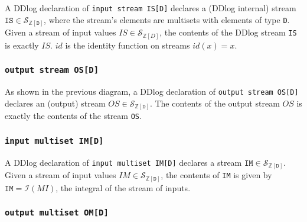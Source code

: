 \documentclass[10pt]{article}
\newcommand{\code}[1]{\texttt{#1}}
\newcommand{\Z}{\mathbb{Z}}  %
\newcommand{\stream}[1]{\ensuremath{\mathcal{S}_{#1}}}
\newcommand{\I}{\mathcal{I}}  %
\newcommand{\id}{\ensuremath{\mathit{id}}} %
\begin{document}
A DDlog declaration of \code{input stream IS[D]} declares a (DDlog
internal) stream $\code{IS} \in \stream{\Z[\code{D}]}$, where the
stream's elements are multisets with elements of type \code{D}.  Given
a stream of input values $IS \in \stream{\Z[D]}$, the contents of the
DDlog stream \code{IS} is exactly $IS$.  $\id$ is the identity
function on streams $\id(x) = x$.

\subsubsection{\code{output stream OS[D]}}


As shown in the previous diagram, a DDlog declaration of \code{output
  stream OS[D]} declares an (output) stream $OS \in
\stream{\Z[\code{D}]}$.  The contents of the output stream $OS$ is
exactly the contents of the stream \code{OS}.

\subsubsection{\code{input multiset IM[D]}}


A DDlog declaration of \code{input multiset IM[D]} declares a stream
$\code{IM} \in \stream{\Z[\code{D}]}$.  Given a stream of input values
$IM \in \stream{\Z[\code{D}]}$, the contents of \code{IM} is given by
$\code{IM} = \I(MI)$, the integral of the stream of inputs.

\subsubsection{\code{output multiset OM[D]}}
\end{document}
